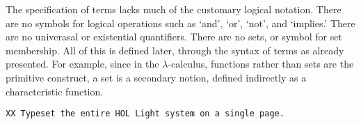 \documentclass{llncs}
\def\op#1{{\hbox{#1}}} %
\begin{document}


The specification of terms lacks much of the customary logical notation.
There are no symbols for logical operations such as
`and', `or', `not', and `implies.'  There are no univerasal or existential quantifiers.  There are no sets, or symbol for set membership.  All of this
is defined later, through the syntax of terms as already presented.  
For example, since in the $\lambda$-calculus, functions rather
than sets are the primitive construct, a set is a secondary notion,
defined indirectly as a characteristic function.


{\tt XX Typeset the entire HOL Light system on a single page.}
\end{document}
